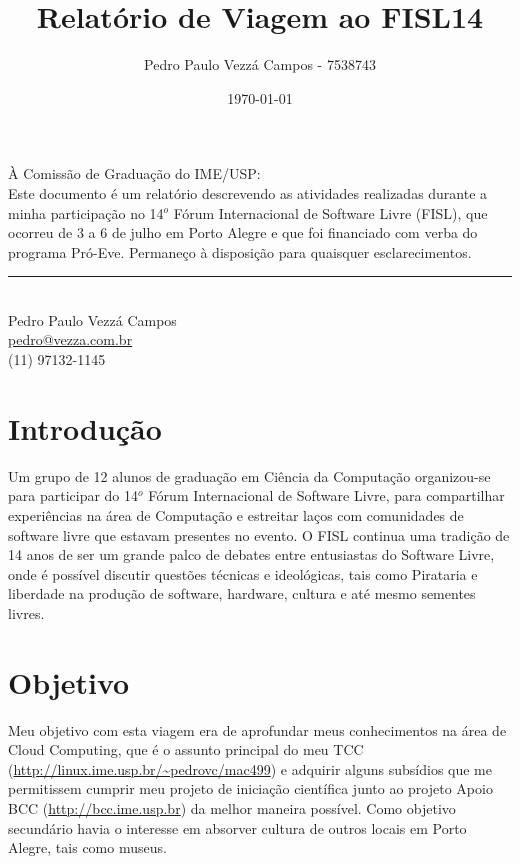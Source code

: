 \documentclass{article}
\begin{document}
\title{Relatório de Viagem ao FISL14}
\author{Pedro Paulo Vezzá Campos - 7538743}
\date{\today}

\maketitle


\hfill À Comissão de Graduação do IME/USP:\\

Este documento é um relatório descrevendo as atividades realizadas durante a minha participação no 14$^o$ Fórum Internacional de Software Livre (FISL), que ocorreu de 3 a 6 de julho em Porto Alegre e que foi financiado com verba do programa Pró-Eve. Permaneço à disposição para quaisquer esclarecimentos.

\vspace{3cm}

\begin{flushright}
	\noindent\rule{8cm}{0.4pt} \\
	Pedro Paulo Vezzá Campos\\
	\url{pedro@vezza.com.br}\\
	(11) 97132-1145\\
\end{flushright}


\section{Introdução}
Um grupo de 12 alunos de graduação em Ciência da Computação organizou-se para participar do 14$^o$ Fórum Internacional de Software Livre, para compartilhar experiências na área de Computação e estreitar laços com comunidades de software livre que estavam presentes no evento. O FISL continua uma tradição de 14 anos de ser um grande palco de debates entre entusiastas do Software Livre, onde é possível discutir questões técnicas e ideológicas, tais como Pirataria e liberdade na produção de software, hardware, cultura e até mesmo sementes livres.

\section{Objetivo}
Meu objetivo com esta viagem era de aprofundar meus conhecimentos na área de Cloud Computing, que é o assunto principal do meu TCC (\url{http://linux.ime.usp.br/~pedrovc/mac499}) e adquirir alguns subsídios que me permitissem cumprir meu projeto de iniciação científica junto ao projeto Apoio BCC (\url{http://bcc.ime.usp.br}) da melhor maneira possível. Como objetivo secundário havia o interesse em absorver cultura de outros locais em Porto Alegre, tais como museus.
\end{document}
